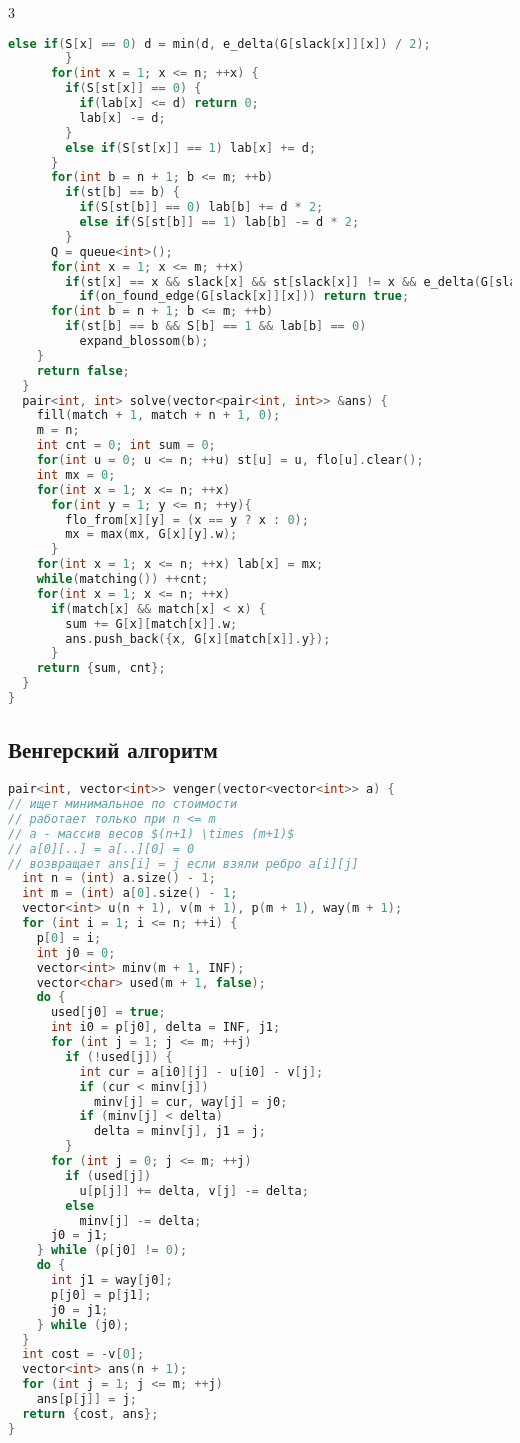 \documentclass[9pt,a4paper,landscape,twosided]{extarticle}
\begin{document}
\begin{multicols*}{3}
\begin{lstlisting}[language=C++]
          else if(S[x] == 0) d = min(d, e_delta(G[slack[x]][x]) / 2);
        }
      for(int x = 1; x <= n; ++x) {
        if(S[st[x]] == 0) {
          if(lab[x] <= d) return 0;
          lab[x] -= d;
        }
        else if(S[st[x]] == 1) lab[x] += d;
      }
      for(int b = n + 1; b <= m; ++b)
        if(st[b] == b) {
          if(S[st[b]] == 0) lab[b] += d * 2;
          else if(S[st[b]] == 1) lab[b] -= d * 2;
        }
      Q = queue<int>();
      for(int x = 1; x <= m; ++x)
        if(st[x] == x && slack[x] && st[slack[x]] != x && e_delta(G[slack[x]][x]) == 0)
          if(on_found_edge(G[slack[x]][x])) return true;
      for(int b = n + 1; b <= m; ++b)
        if(st[b] == b && S[b] == 1 && lab[b] == 0)
          expand_blossom(b);
    }
    return false;
  }
  pair<int, int> solve(vector<pair<int, int>> &ans) {
    fill(match + 1, match + n + 1, 0);
    m = n;
    int cnt = 0; int sum = 0;
    for(int u = 0; u <= n; ++u) st[u] = u, flo[u].clear();
    int mx = 0;
    for(int x = 1; x <= n; ++x)
      for(int y = 1; y <= n; ++y){
        flo_from[x][y] = (x == y ? x : 0);
        mx = max(mx, G[x][y].w);
      }
    for(int x = 1; x <= n; ++x) lab[x] = mx;
    while(matching()) ++cnt;
    for(int x = 1; x <= n; ++x)
      if(match[x] && match[x] < x) {
        sum += G[x][match[x]].w;
        ans.push_back({x, G[x][match[x]].y});
      }
    return {sum, cnt};
  }
}
\end{lstlisting}

\subsection{Венгерский алгоритм}
\begin{lstlisting}[language=C++]
pair<int, vector<int>> venger(vector<vector<int>> a) {
// ищет минимальное по стоимости
// работает только при n <= m
// a - массив весов $(n+1) \times (m+1)$
// a[0][..] = a[..][0] = 0
// возвращает ans[i] = j если взяли ребро a[i][j]
  int n = (int) a.size() - 1;
  int m = (int) a[0].size() - 1;
  vector<int> u(n + 1), v(m + 1), p(m + 1), way(m + 1);
  for (int i = 1; i <= n; ++i) {
    p[0] = i;
    int j0 = 0;
    vector<int> minv(m + 1, INF);
    vector<char> used(m + 1, false);
    do {
      used[j0] = true;
      int i0 = p[j0], delta = INF, j1;
      for (int j = 1; j <= m; ++j)
        if (!used[j]) {
          int cur = a[i0][j] - u[i0] - v[j];
          if (cur < minv[j])
            minv[j] = cur, way[j] = j0;
          if (minv[j] < delta)
            delta = minv[j], j1 = j;
        }
      for (int j = 0; j <= m; ++j)
        if (used[j])
          u[p[j]] += delta, v[j] -= delta;
        else
          minv[j] -= delta;
      j0 = j1;
    } while (p[j0] != 0);
    do {
      int j1 = way[j0];
      p[j0] = p[j1];
      j0 = j1;
    } while (j0);
  }
  int cost = -v[0];
  vector<int> ans(n + 1);
  for (int j = 1; j <= m; ++j)
    ans[p[j]] = j;
  return {cost, ans};
}
\end{lstlisting}


\end{multicols*}
\end{document}
